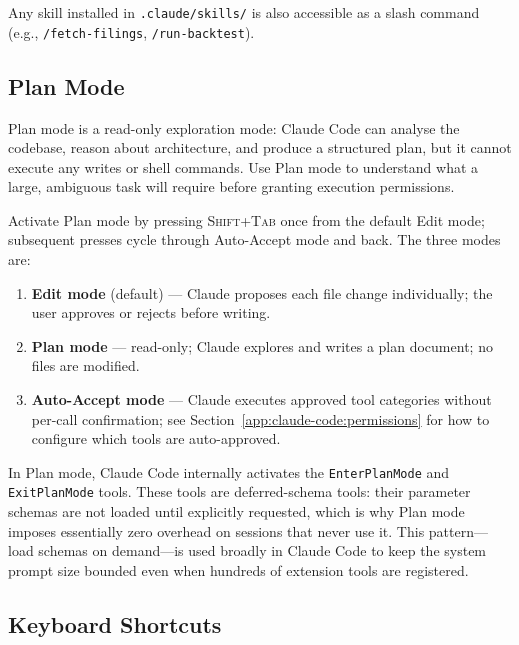 Any skill installed in \texttt{.claude/skills/} is also accessible as a slash
command (e.g., \texttt{/fetch-filings}, \texttt{/run-backtest}).

\subsection{Plan Mode}
\label{app:claude-code:plan-mode}

Plan mode is a read-only exploration mode: Claude Code can analyse the
codebase, reason about architecture, and produce a structured plan, but it
cannot execute any writes or shell commands.  Use Plan mode to understand what a
large, ambiguous task will require before granting execution permissions.

Activate Plan mode by pressing \textsc{Shift+Tab} once from the default Edit
mode; subsequent presses cycle through Auto-Accept mode and back.  The three
modes are:

\begin{enumerate}
  \item \textbf{Edit mode} (default) --- Claude proposes each file change
        individually; the user approves or rejects before writing.
  \item \textbf{Plan mode} --- read-only; Claude explores and writes a plan
        document; no files are modified.
  \item \textbf{Auto-Accept mode} --- Claude executes approved tool categories
        without per-call confirmation; see Section~\ref{app:claude-code:permissions}
        for how to configure which tools are auto-approved.
\end{enumerate}

\begin{deepdive}
In Plan mode, Claude Code internally activates the \texttt{EnterPlanMode} and
\texttt{ExitPlanMode} tools.  These tools are deferred-schema tools: their
parameter schemas are not loaded until explicitly requested, which is why Plan
mode imposes essentially zero overhead on sessions that never use it.  This
pattern---load schemas on demand---is used broadly in Claude Code to keep the
system prompt size bounded even when hundreds of extension tools are registered.
\end{deepdive}

\subsection{Keyboard Shortcuts}
\label{app:claude-code:shortcuts}

